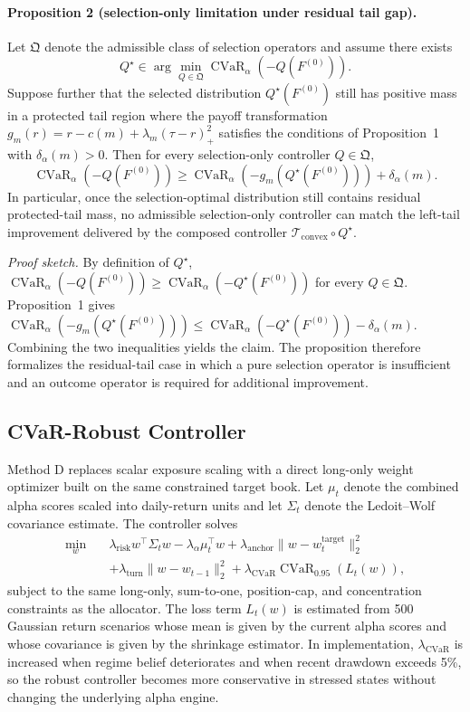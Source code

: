 \documentclass[10pt,twocolumn]{article}
\begin{document}
\paragraph{Proposition 2 (selection-only limitation under residual tail gap).}
Let $\mathfrak{Q}$ denote the admissible class of selection operators and
assume there exists
\[
Q^\star \in \arg\min_{Q \in \mathfrak{Q}}
\operatorname{CVaR}_\alpha(-Q(F^{(0)})).
\]
Suppose further that the selected distribution $Q^\star(F^{(0)})$ still has
positive mass in a protected tail region where the payoff transformation
$g_m(r)=r-c(m)+\lambda_m(\tau-r)_+^2$ satisfies the conditions of
Proposition~1 with $\delta_\alpha(m)>0$. Then for every selection-only
controller $Q \in \mathfrak{Q}$,
\[
\operatorname{CVaR}_\alpha(-Q(F^{(0)}))
\ge
\operatorname{CVaR}_\alpha(-g_m(Q^\star(F^{(0)}))) + \delta_\alpha(m).
\]
In particular, once the selection-optimal distribution still contains residual
protected-tail mass, no admissible selection-only controller can match the
left-tail improvement delivered by the composed controller
$\mathcal{T}_{\text{convex}}\circ Q^\star$.

\emph{Proof sketch.} By definition of $Q^\star$,
$\operatorname{CVaR}_\alpha(-Q(F^{(0)})) \ge
\operatorname{CVaR}_\alpha(-Q^\star(F^{(0)}))$ for every
$Q \in \mathfrak{Q}$. Proposition~1 gives
$\operatorname{CVaR}_\alpha(-g_m(Q^\star(F^{(0)}))) \le
\operatorname{CVaR}_\alpha(-Q^\star(F^{(0)}))-\delta_\alpha(m)$.
Combining the two inequalities yields the claim. The proposition therefore
formalizes the residual-tail case in which a pure selection operator is
insufficient and an outcome operator is required for additional improvement.

\subsection{CVaR-Robust Controller}

Method D replaces scalar exposure scaling with a direct long-only weight
optimizer built on the same constrained target book. Let $\mu_t$ denote the
combined alpha scores scaled into daily-return units and let $\Sigma_t$ denote
the Ledoit--Wolf covariance estimate. The controller solves
\begin{align*}
\min_w \quad &
\lambda_{\mathrm{risk}} w^\top \Sigma_t w
- \lambda_{\alpha}\mu_t^\top w
+ \lambda_{\mathrm{anchor}}\lVert w-w_t^{\mathrm{target}} \rVert_2^2
\\
&+ \lambda_{\mathrm{turn}}\lVert w-w_{t-1} \rVert_2^2
+ \lambda_{\mathrm{CVaR}} \operatorname{CVaR}_{0.95}(L_t(w)),
\end{align*}
subject to the same long-only, sum-to-one, position-cap, and concentration
constraints as the allocator. The loss term $L_t(w)$ is estimated from 500
Gaussian return scenarios whose mean is given by the current alpha scores and
whose covariance is given by the shrinkage estimator. In implementation,
$\lambda_{\mathrm{CVaR}}$ is increased when regime belief deteriorates and when
recent drawdown exceeds 5\%, so the robust controller becomes more conservative
in stressed states without changing the underlying alpha engine.
\end{document}
